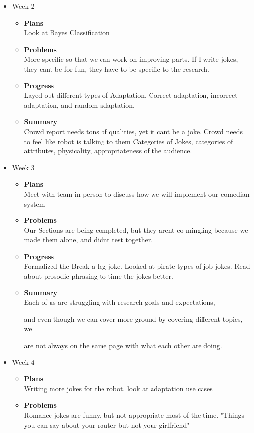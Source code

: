 \begin{itemize}
\begin{itemize}
			\end{itemize}
		\item{Week 2}
			\begin{itemize}
				\item \textbf{Plans} \\
				Look at Bayes Classification
				\item \textbf{Problems} \\
				More specific so that we can work on improving parts. If I write jokes, they cant be for fun, they have to be specific to the research. 
				\item \textbf{Progress} \\
				Layed out different types of Adaptation. Correct adaptation, incorrect adaptation, and random adaptation.
				\item \textbf{Summary} \\
				Crowd report needs tons of qualities, yet it cant be a joke. Crowd needs to feel like robot is talking to them
				Categories of Jokes, categories of attributes, physicality, appropriateness of the audience.
			\end{itemize}
		\item{Week 3}
			\begin{itemize}
				\item \textbf{Plans} \\
				Meet with team in person to discuss how we will implement our comedian system
				\item \textbf{Problems} \\
				Our Sections are being completed, but they arent co-mingling because we made them alone, and didnt test together.
				\item \textbf{Progress} \\
				Formalized the Break a leg joke.
				Looked at pirate types of job jokes.
				Read about prosodic phrasing to time the jokes better.
				\item \textbf{Summary} \\
			Each of us are struggling with research goals and expectations, 

			and even though we can cover more ground by covering different topics, we 

			are not always on the same page with what each other are doing. 
			\end{itemize}
		\item{Week 4}
			\begin{itemize}
				\item \textbf{Plans} \\
				Writing more jokes for the robot.
				look at adaptation use cases
				\item \textbf{Problems} \\
				Romance jokes are funny, but not appropriate most of the time.
				"Things you can say about your router but not your girlfriend"


\end{itemize}
\end{itemize}
